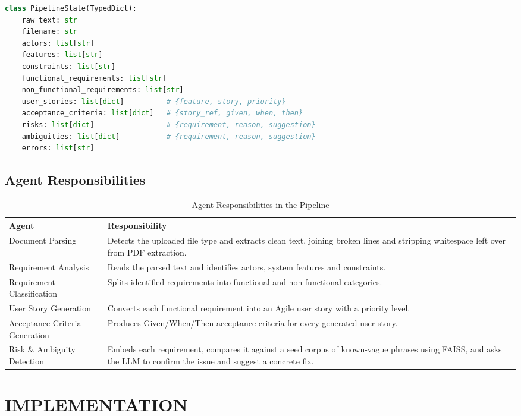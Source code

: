 \documentclass[12pt,a4paper,openany]{report}
\begin{document}
\begin{lstlisting}[language=Python]
class PipelineState(TypedDict):
    raw_text: str
    filename: str
    actors: list[str]
    features: list[str]
    constraints: list[str]
    functional_requirements: list[str]
    non_functional_requirements: list[str]
    user_stories: list[dict]          # {feature, story, priority}
    acceptance_criteria: list[dict]   # {story_ref, given, when, then}
    risks: list[dict]                 # {requirement, reason, suggestion}
    ambiguities: list[dict]           # {requirement, reason, suggestion}
    errors: list[str]
\end{lstlisting}

\section{Agent Responsibilities}
\begin{longtable}{|p{3.3cm}|p{9.8cm}|}
\caption{Agent Responsibilities in the Pipeline}\\
\hline
\textbf{Agent} & \textbf{Responsibility} \\
\hline
Document Parsing & Detects the uploaded file type and extracts clean text, joining broken lines and stripping whitespace left over from PDF extraction. \\
\hline
Requirement Analysis & Reads the parsed text and identifies actors, system features and constraints. \\
\hline
Requirement Classification & Splits identified requirements into functional and non-functional categories. \\
\hline
User Story Generation & Converts each functional requirement into an Agile user story with a priority level. \\
\hline
Acceptance Criteria Generation & Produces Given/When/Then acceptance criteria for every generated user story. \\
\hline
Risk \& Ambiguity Detection & Embeds each requirement, compares it against a seed corpus of known-vague phrases using FAISS, and asks the LLM to confirm the issue and suggest a concrete fix. \\
\hline
\end{longtable}
\FloatBarrier

\chapter{IMPLEMENTATION}
\end{document}
